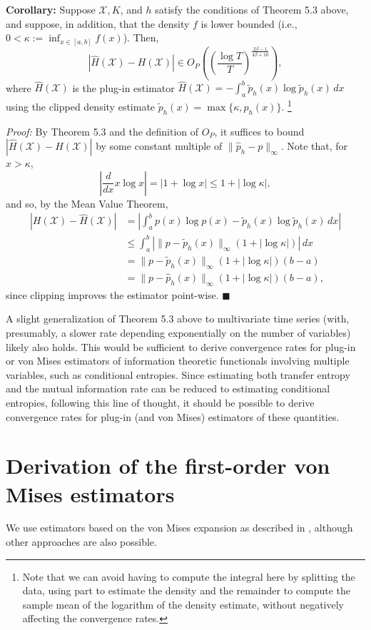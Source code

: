 \documentclass{article} %
\renewcommand{\qed}{\quad \ensuremath{\blacksquare}}    %
\newcommand{\X}{\mathcal{X}}                        %
\renewcommand{\hat}{\widehat}
\renewcommand{\tilde}{\widetilde}
\begin{document}
{\bf Corollary:} Suppose $\X, K$, and $h$ satisfy the conditions of Theorem 5.3
above, and suppose, in addition, that the density $f$ is lower bounded (i.e.,
$0 < \kappa := \inf_{x \in [a,b]} f(x)$). Then,
\[|\hat H(\X) - H(\X)|
    \in O_P\left( \left( \frac{\log T}{T} \right)^{\frac{2\beta - 1}{4\beta + 10}} \right),\]
where $\hat H(\X)$ is the plug-in estimator
$\hat H(\X) = -\int_a^b \tilde p_h(x) \log \tilde p_h(x) \, dx$ using the
clipped density estimate $\tilde p_h(x) = \max\{\kappa, \hat p_h(x)\}$.
\footnote{Note that we can avoid having to compute the integral here by
splitting the data, using part to estimate the density and the remainder to
compute the sample mean of the logarithm of the density estimate, without
negatively affecting the convergence rates.}

\emph{Proof:} By Theorem 5.3 and the definition of $O_P$, it suffices to bound
$|\hat H(\X) - H(\X)|$ by some constant multiple of $\|\hat p_h - p\|_\infty$.
Note that, for $x > \kappa$,
\[\left| \frac{d}{dx} x \log x \right|
                                = |1 + \log x| \leq 1 + |\log \kappa|,\]
and so, by the Mean Value Theorem,
\begin{align*}
|H(\X) - \hat H(\X)|
 &  = \left| \int_a^b p(x) \log p(x) - \tilde p_h(x) \log \tilde p_h(x) \, dx \right|   \\
 &  \leq \int_a^b |\|p - \tilde p_h(x)\|_\infty (1 + |\log \kappa|)| \, dx  \\
 &  = \|p - \tilde p_h(x)\|_\infty (1 + |\log \kappa|) (b - a)  \\
 &  = \|p - \hat p_h(x)\|_\infty (1 + |\log \kappa|) (b - a),
\end{align*}
since clipping improves the estimator point-wise. \qed

A slight generalization of Theorem 5.3 above to multivariate time series (with,
presumably, a slower rate depending exponentially on the number of variables)
likely also holds. This would be sufficient to derive convergence rates for
plug-in or von Mises estimators of information theoretic functionals involving
multiple variables, such as conditional entropies. Since estimating both
transfer entropy and the mutual information rate can be reduced to estimating
conditional entropies, following this line of thought, it should be possible to
derive convergence rates for plug-in (and von Mises) estimators of these
quantities.


\section{Derivation of the first-order von Mises estimators}
\label{sec:von_mises}
We use estimators based on the von Mises expansion as described in
\cite{kandasamy2014influence}, although other approaches are also possible.
\end{document}
